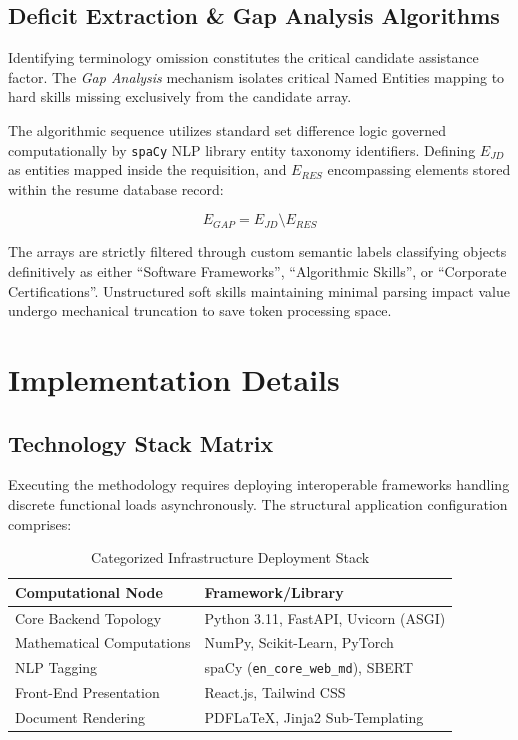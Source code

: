 \documentclass[12pt,a4paper]{report}
\begin{document}
\section{Deficit Extraction \& Gap Analysis Algorithms}
Identifying terminology omission constitutes the critical candidate assistance factor. The \textit{Gap Analysis} mechanism isolates critical Named Entities mapping to hard skills missing exclusively from the candidate array. 

The algorithmic sequence utilizes standard set difference logic governed computationally by \texttt{spaCy} NLP library entity taxonomy identifiers. Defining $E_{JD}$ as entities mapped inside the requisition, and $E_{RES}$ encompassing elements stored within the resume database record:

\begin{equation}
E_{GAP} = E_{JD} \setminus E_{RES}
\end{equation}

The arrays are strictly filtered through custom semantic labels classifying objects definitively as either ``Software Frameworks'', ``Algorithmic Skills'', or ``Corporate Certifications''. Unstructured soft skills maintaining minimal parsing impact value undergo mechanical truncation to save token processing space.

\chapter{Implementation Details}

\section{Technology Stack Matrix}
Executing the methodology requires deploying interoperable frameworks handling discrete functional loads asynchronously. The structural application configuration comprises:

\begin{table}[H]
    \centering
    \caption{Categorized Infrastructure Deployment Stack}
    \vspace{0.3cm}
    \begin{tabular}{|l|l|}
        \hline
        \textbf{Computational Node} & \textbf{Framework/Library} \\ \hline
        Core Backend Topology & Python 3.11, FastAPI, Uvicorn (ASGI) \\ \hline
        Mathematical Computations & NumPy, Scikit-Learn, PyTorch \\ \hline
        NLP Tagging & spaCy (\texttt{en\_core\_web\_md}), SBERT \\ \hline
        Front-End Presentation & React.js, Tailwind CSS \\ \hline
        Document Rendering & PDFLaTeX, Jinja2 Sub-Templating \\ \hline
    \end{tabular}
\end{table}
\end{document}

